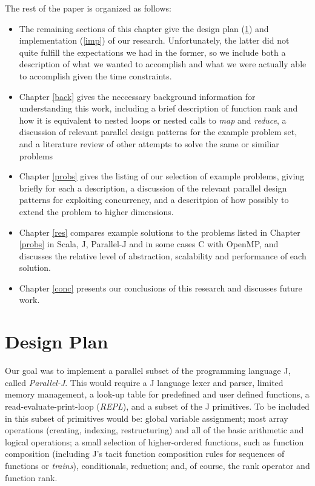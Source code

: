 The rest of the paper is organized as follows:
\begin{itemize}
	\item The remaining sections of this chapter give the design plan (\ref{desp}) and implementation (\ref{imp}) of our research. 
	Unfortunately, the latter did not quite fulfill the expectations we had in the former, so we include both a description of what we wanted to accomplish and what we were actually able to accomplish given the time constraints. 
	\item Chapter \ref{back} gives the neccessary background information for understanding this work, 
	including a brief description of function rank and how it is equivalent to nested loops or nested calls to \textit{map} and \textit{reduce},
	a discussion of relevant parallel design patterns for the example problem set, 
	and a literature review of other attempts to solve the same or similiar problems
    \item Chapter \ref{probs} gives the listing of our selection of example problems, giving briefly for each a description, a discussion of the relevant parallel design patterns for exploiting concurrency, and a descritpion of how possibly to extend the problem to higher dimensions.
    \item Chapter \ref{res} compares example solutions to the problems listed in Chapter \ref{probs} in Scala, J, Parallel-J and in some cases C with OpenMP, and discusses the relative level of abstraction, scalability and performance of each solution. %
    \item Chapter \ref{conc} presents our conclusions of this research and discusses future work.
\end{itemize}

\section{Design Plan}
\label{desp}
Our goal was to implement a parallel subset of the programming language J, called \textit{Parallel-J}.
This would require a J language lexer and parser, limited memory management, a look-up table for predefined and user defined functions, a read-evaluate-print-loop (\textit{REPL}), and a subset of the J primitives.
To be included in this subset of primitives would be: global variable assignment; 
most array operations (creating, indexing, restructuring) and all of the basic arithmetic and logical operations; 
a small selection of higher-ordered functions, such as function composition (including J's tacit function composition rules for sequences of functions or \textit{trains}), conditionals, reduction;
and, of course, the rank operator and function rank. %

